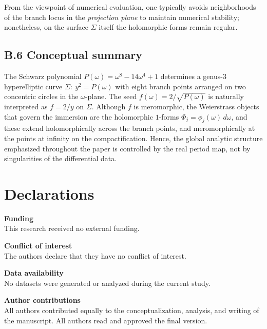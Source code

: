 \documentclass[12pt]{article}
\numberwithin{equation}{section}
\theoremstyle{definition}
\theoremstyle{remark}
\begin{document}
From the viewpoint of numerical evaluation, one typically avoids neighborhoods of the branch locus in the \emph{projection plane} to maintain numerical stability; nonetheless, on the surface $\Sigma$ itself the holomorphic forms remain regular.

\subsection*{B.6 Conceptual summary}

The Schwarz polynomial $P(\omega)=\omega^8-14\omega^4+1$ determines a genus-$3$ hyperelliptic
curve $\Sigma:\ y^2=P(\omega)$ with eight branch points arranged on two concentric circles in the
$\omega$-plane. The seed $f(\omega)=2/\sqrt{P(\omega)}$ is naturally interpreted as $f=2/y$ on $\Sigma$.
Although $f$ is meromorphic, the Weierstrass objects that govern the immersion are the holomorphic $1$-forms
$\Phi_j=\phi_j(\omega)\,d\omega$, and these extend holomorphically across the branch points, and meromorphically at the points at infinity on the compactification.
Hence, the global analytic structure emphasized throughout the paper is controlled by the real period map,
not by singularities of the differential data.





\section*{Declarations}

\noindent\textbf{Funding} \\
This research received no external funding.

\vspace{0.6em}
\noindent\textbf{Conflict of interest} \\
The authors declare that they have no conflict of interest.

\vspace{0.6em}
\noindent\textbf{Data availability} \\
No datasets were generated or analyzed during the current study.

\vspace{0.6em}
\noindent\textbf{Author contributions} \\
All authors contributed equally to the conceptualization, analysis, and writing of the manuscript. All authors read and approved the final version.

\end{document}
